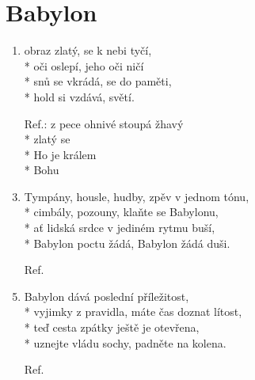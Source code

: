 \section{Babylon}
\begin{enumerate}
\item {} obraz zlatý,  se k nebi tyčí,\\*
 oči oslepí,  jeho oči ničí \\*
 snů se vkrádá,  se do paměti,\\*
 hold si vzdává,   světí.
\item[Ref.:]  z pece ohnivé  stoupá žhavý \\*
 zlatý  se \\*
Ho  je králem \\* 
 Bohu   

\item Tympány, housle, hudby, zpěv v jednom tónu,\\*
cimbály, pozouny, klaňte se Babylonu,\\*
ať lidská srdce v jediném rytmu buší,\\*
Babylon poctu žádá, Babylon žádá duši.  \item[Ref.]\,
\item Babylon dává poslední příležitost,\\*
vyjimky z pravidla, máte čas doznat lítost,\\*
teď cesta zpátky ještě je otevřena, \\*
uznejte vládu sochy, padněte na kolena.
\item[Ref.]\, 
\end{enumerate}
